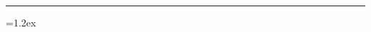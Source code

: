 \def\MakeSongHeader#1#2#3#4#5{{
\noindent\bf #1 \hfill #5\par%
\noindent\hskip 3em\it #2\par}}
%
\def\MakeParBegin{%
  \ifx V\TypeOfVerse \hbox to \parindent {\MakeVerse\hfil}%
  \else\ifx R\TypeOfVerse \hbox to \parindent {\MakeRef\hfil}%
  \else\ifx M\TypeOfVerse%
  \else\hbox{\hskip\parindent}%
  \fi\fi\fi}
\def\MakeVerse{\NumOfVerse.}
\def\MakeRef{R\NumOfVerse:}
%
\def\MakeLineIndent{%
  \ifx M\TypeOfVerse\else\hbox to \parindent{}\fi%
}  
\def\MakeVerse{\NumOfVerse.}
\def\MakeRef{R\NumOfVerse:}


\hrule

%
%
\parindent=17pt
\parskip=1.2ex

\bye



